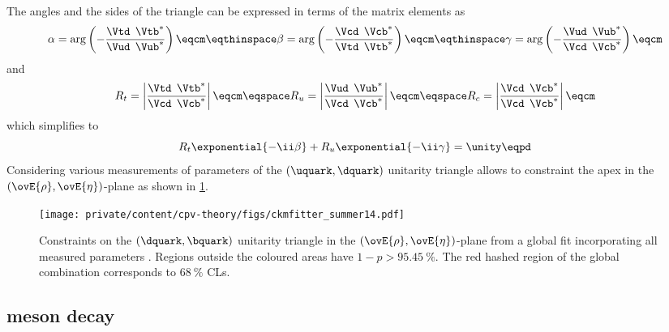 The angles and the sides of the triangle can be expressed in terms of the matrix
elements as
%
\begin{equation}
  \alpha = \arg\left(-\frac{\Vtd^{\phantom{\ast}}\Vtb^{\ast}}{\Vud^{\phantom{\ast}}\Vub^{\ast}}\right)\eqcm\eqthinspace 
  \beta =  \arg\left(-\frac{\Vcd^{\phantom{\ast}}\Vcb^{\ast}}{\Vtd^{\phantom{\ast}}\Vtb^{\ast}}\right)\eqcm\eqthinspace 
  \gamma = \arg\left(-\frac{\Vud^{\phantom{\ast}}\Vub^{\ast}}{\Vcd^{\phantom{\ast}}\Vcb^{\ast}}\right)\eqcm
\end{equation}
%
and
%
\begin{equation}
  R_t = \left| \frac{\Vtd^{\phantom{\ast}}\Vtb^{\ast}}{\Vcd^{\phantom{\ast}}\Vcb^{\ast}} \right|\eqcm\eqspace
  R_u = \left| \frac{\Vud^{\phantom{\ast}}\Vub^{\ast}}{\Vcd^{\phantom{\ast}}\Vcb^{\ast}} \right|\eqcm\eqspace
  R_c = \left| \frac{\Vcd^{\phantom{\ast}}\Vcb^{\ast}}{\Vcd^{\phantom{\ast}}\Vcb^{\ast}} \right|\eqcm
\end{equation}
%
which simplifies to
%
\begin{equation}
  R_t \exponential{-\ii\beta} + R_u \exponential{-\ii\gamma} = \unity \eqpd
\end{equation}
%
Considering various measurements of parameters of the ${(\uquark,\dquark)}$
unitarity triangle allows to constraint the apex in the
${(\ovE{\rho},\ovE{\eta})}$-plane \cite{Charles:2004jd,Bona:2006ah} as shown in
\cref{fig:cpv_theory:flavour_physics:ckm_matrix:ckm_fitter_14}.

\begin{figure}[ht]
\centering
\texttt{[image: private/content/cpv-theory/figs/ckmfitter\_summer14.pdf]}
\caption{Constraints on the ${(\dquark,\bquark)}$ unitarity triangle in the
${(\ovE{\rho},\ovE{\eta})}$-plane from a global fit incorporating all measured
\CKM parameters \cite{Charles:2004jd}. Regions outside the coloured areas have
$1-p > \SI{95.45}{\percent}$. The red hashed region of the global combination
corresponds to $\SI{68}{\percent}$ \acp{CL}.}
\label{fig:cpv_theory:flavour_physics:ckm_matrix:ckm_fitter_14}
\end{figure}

\subsection[
  head={\B meson decay},
  tocentry={\BHyperref meson decay}
]{\Bbfsf meson decay}
\label{sec:cpv_theory:flavour_physics:bdecays}

